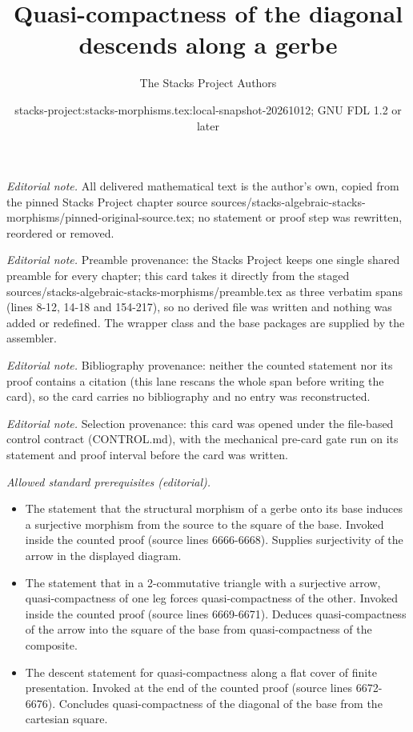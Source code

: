 \documentclass[10pt,a4paper]{amsart}
\title{Quasi-compactness of the diagonal descends along a gerbe}
\author{The Stacks Project Authors}
\date{stacks-project:stacks-morphisms.tex:local-snapshot-20261012; GNU FDL 1.2 or later}
\theoremstyle{plain}
\theoremstyle{definition}
\theoremstyle{remark}
\numberwithin{equation}{subsection}
\begin{document}
\maketitle
\noindent\textit{Editorial note.} All delivered mathematical text is the author's own, copied from the pinned Stacks Project chapter source sources/stacks-algebraic-stacks-morphisms/pinned-original-source.tex; no statement or proof step was rewritten, reordered or removed.\par\medskip
\noindent\textit{Editorial note.} Preamble provenance: the Stacks Project keeps one single shared preamble for every chapter; this card takes it directly from the staged sources/stacks-algebraic-stacks-morphisms/preamble.tex as three verbatim spans (lines 8-12, 14-18 and 154-217), so no derived file was written and nothing was added or redefined. The wrapper class and the base packages are supplied by the assembler.\par\medskip
\noindent\textit{Editorial note.} Bibliography provenance: neither the counted statement nor its proof contains a citation (this lane rescans the whole span before writing the card), so the card carries no bibliography and no entry was reconstructed.\par\medskip
\noindent\textit{Editorial note.} Selection provenance: this card was opened under the file-based control contract (CONTROL.md), with the mechanical pre-card gate run on its statement and proof interval before the card was written.\par\medskip
\noindent\textit{Allowed standard prerequisites (editorial).}\begin{itemize}
\item The statement that the structural morphism of a gerbe onto its base induces a surjective morphism from the source to the square of the base. Invoked inside the counted proof (source lines 6666-6668). Supplies surjectivity of the arrow in the displayed diagram.
\item The statement that in a 2-commutative triangle with a surjective arrow, quasi-compactness of one leg forces quasi-compactness of the other. Invoked inside the counted proof (source lines 6669-6671). Deduces quasi-compactness of the arrow into the square of the base from quasi-compactness of the composite.
\item The descent statement for quasi-compactness along a flat cover of finite presentation. Invoked at the end of the counted proof (source lines 6672-6676). Concludes quasi-compactness of the diagonal of the base from the cartesian square.
\end{itemize}\medskip
\end{document}
